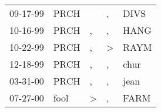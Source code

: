 \begin{supertabular}{p{0.07\textwidth}p{0.06\textwidth}p{0.02\textwidth}p{0.02\textwidth}p{0.06\textwidth}}
 09-17-99\textsuperscript{} &  PRCH\textsuperscript{} &               &             , &  DIVS\textsuperscript{} \\
 10-16-99\textsuperscript{} &  PRCH\textsuperscript{} &             , &             , &  HANG\textsuperscript{} \\
 10-22-99\textsuperscript{} &  PRCH\textsuperscript{} &             , &  \textgreater &  RAYM\textsuperscript{} \\
 12-18-99\textsuperscript{} &  PRCH\textsuperscript{} &             , &             , &  chur\textsuperscript{} \\
 03-31-00\textsuperscript{} &  PRCH\textsuperscript{} &             , &             , &  jean\textsuperscript{} \\
 07-27-00\textsuperscript{} &  fool\textsuperscript{} &  \textgreater &             , &  FARM\textsuperscript{} \\
\end{supertabular}
